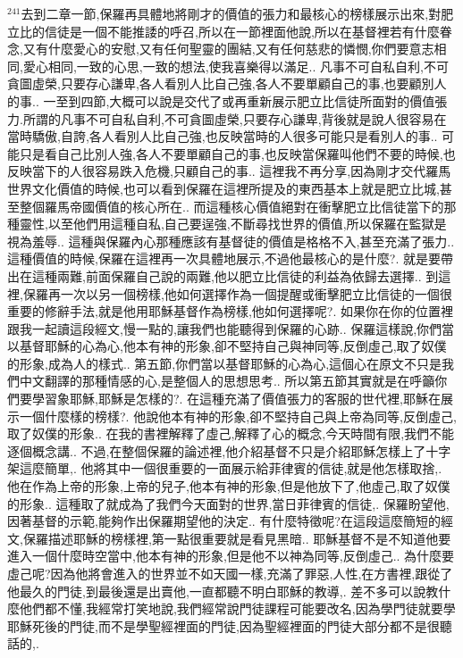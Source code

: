 \documentclass{book}
\begin{document}
$^{241}$去到二章一節,保羅再具體地將剛才的價值的張力和最核心的榜樣展示出來,對肥立比的信徒是一個不能推諉的呼召,所以在一節裡面他說,所以在基督裡若有什麼眷念,又有什麼愛心的安慰,又有任何聖靈的團結,又有任何慈悲的憐憫,你們要意志相同,愛心相同,一致的心思,一致的想法,使我喜樂得以滿足..
凡事不可自私自利,不可貪圖虛榮,只要存心謙卑,各人看別人比自己強,各人不要單顧自己的事,也要顧別人的事..
一至到四節,大概可以說是交代了或再重新展示肥立比信徒所面對的價值張力.所謂的凡事不可自私自利,不可貪圖虛榮,只要存心謙卑,背後就是說人很容易在當時驕傲,自誇,各人看別人比自己強,也反映當時的人很多可能只是看別人的事..
可能只是看自己比別人強,各人不要單顧自己的事,也反映當保羅叫他們不要的時候,也反映當下的人很容易跌入危機,只顧自己的事..
這裡我不再分享,因為剛才交代羅馬世界文化價值的時候,也可以看到保羅在這裡所提及的東西基本上就是肥立比城,甚至整個羅馬帝國價值的核心所在..
而這種核心價值絕對在衝擊肥立比信徒當下的那種靈性,以至他們用這種自私,自己要逞強,不斷尋找世界的價值,所以保羅在監獄是視為羞辱..
這種與保羅內心那種應該有基督徒的價值是格格不入,甚至充滿了張力..
這種價值的時候,保羅在這裡再一次具體地展示,不過他最核心的是什麼?.
就是要帶出在這種兩難,前面保羅自己說的兩難,他以肥立比信徒的利益為依歸去選擇..
到這裡,保羅再一次以另一個榜樣,他如何選擇作為一個提醒或衝擊肥立比信徒的一個很重要的修辭手法,就是他用耶穌基督作為榜樣,他如何選擇呢?.
如果你在你的位置裡跟我一起讀這段經文,慢一點的,讓我們也能聽得到保羅的心跡..
保羅這樣說,你們當以基督耶穌的心為心,他本有神的形象,卻不堅持自己與神同等,反倒虛己,取了奴僕的形象,成為人的樣式..
第五節,你們當以基督耶穌的心為心,這個心在原文不只是我們中文翻譯的那種情感的心,是整個人的思想思考..
所以第五節其實就是在呼籲你們要學習象耶穌,耶穌是怎樣的?.
在這種充滿了價值張力的客服的世代裡,耶穌在展示一個什麼樣的榜樣?.
他說他本有神的形象,卻不堅持自己與上帝為同等,反倒虛己,取了奴僕的形象..
在我的書裡解釋了虛己,解釋了心的概念,今天時間有限,我們不能逐個概念講..
不過,在整個保羅的論述裡,他介紹基督不只是介紹耶穌怎樣上了十字架這麼簡單,.
他將其中一個很重要的一面展示給菲律賓的信徒,就是他怎樣取捨,.
他在作為上帝的形象,上帝的兒子,他本有神的形象,但是他放下了,他虛己,取了奴僕的形象..
這種取了就成為了我們今天面對的世界,當日菲律賓的信徒,.
保羅盼望他,因著基督的示範,能夠作出保羅期望他的決定..
有什麼特徵呢?在這段這麼簡短的經文,保羅描述耶穌的榜樣裡,第一點很重要就是看見黑暗..
耶穌基督不是不知道他要進入一個什麼時空當中,他本有神的形象,但是他不以神為同等,反倒虛己..
為什麼要虛己呢?因為他將會進入的世界並不如天國一樣,充滿了罪惡,人性,在方書裡,跟從了他最久的門徒,到最後還是出賣他,一直都聽不明白耶穌的教導,.
差不多可以說教什麼他們都不懂,我經常打笑地說,我們經常說門徒課程可能要改名,因為學門徒就要學耶穌死後的門徒,而不是學聖經裡面的門徒,因為聖經裡面的門徒大部分都不是很聽話的,.
\end{document}
